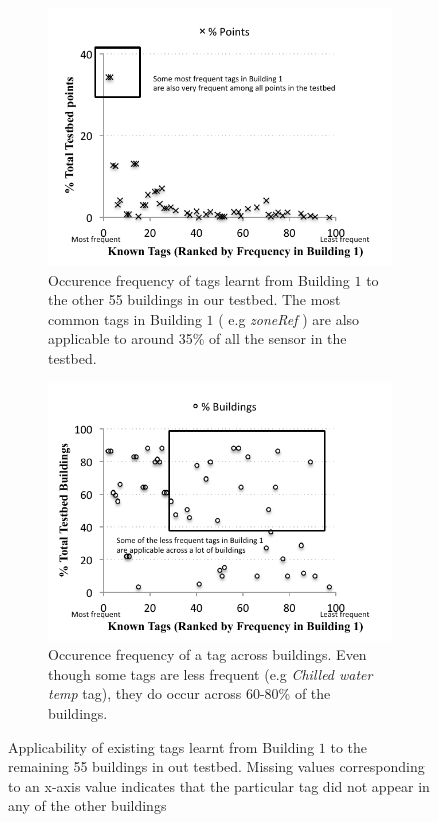 \begin{figure}[h!]
\centering
	\begin{subfigure}{0.40\textwidth}
                \centering
		\includegraphics[width=\textwidth]{./figs/campusWideStats-point.pdf}
                \caption{Occurence frequency of tags learnt from Building $1$ to the other 55 buildings in our testbed. The most common tags in Building $1$ ( e.g {\it zoneRef} ) are also applicable to around 35\% of all the sensor in the testbed.}
                \label{fig:campusWideStats-build}
	\end{subfigure}
	\begin{subfigure}{0.40\textwidth}
                \centering
		\includegraphics[width=\textwidth]{./figs/campusWideStats-build.pdf}
                \caption{Occurence frequency of a tag across buildings. Even though some tags are less frequent (e.g {\it Chilled water temp} tag), they do occur across 60-80\% of the buildings. }
                \label{fig:campusWideStats-build}
	\end{subfigure}
\caption{Applicability of existing tags learnt from Building $1$ to the remaining 55 buildings in out testbed. Missing values corresponding to an x-axis value indicates that the particular tag did not appear in any of the other buildings}
\label{fig:campusWideStats}
\end{figure}



